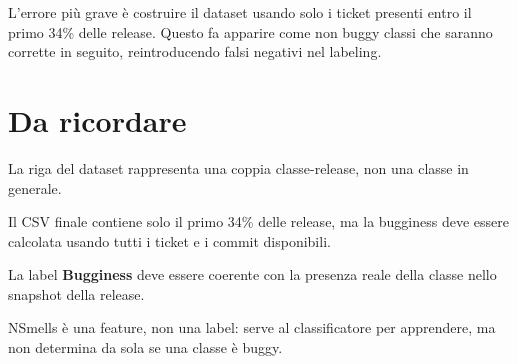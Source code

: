 \begin{notaesame}
L'errore più grave è costruire il dataset usando solo i ticket presenti entro il primo 34\% delle release. Questo fa apparire come non buggy classi che saranno corrette in seguito, reintroducendo falsi negativi nel labeling.
\end{notaesame}

\section{Da ricordare}

\begin{notaesame}
La riga del dataset rappresenta una coppia classe-release, non una classe in generale.
\end{notaesame}

\begin{notaesame}
Il CSV finale contiene solo il primo 34\% delle release, ma la bugginess deve essere calcolata usando tutti i ticket e i commit disponibili.
\end{notaesame}

\begin{notaesame}
La label \textbf{Bugginess} deve essere coerente con la presenza reale della classe nello snapshot della release.
\end{notaesame}

\begin{notaesame}
NSmells è una feature, non una label: serve al classificatore per apprendere, ma non determina da sola se una classe è buggy.
\end{notaesame}